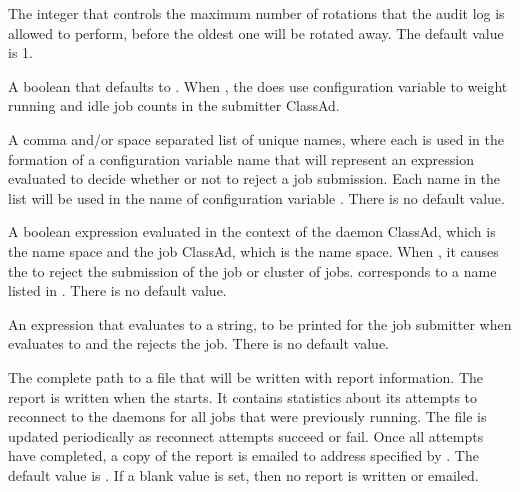 \begin{description}
\label{param:MaxNumScheddAuditLog}
\item[\Macro{MAX\_NUM\_SCHEDD\_AUDIT\_LOG}]
  The integer that controls the maximum number of rotations that
  the  audit log is allowed to perform,
  before the oldest one will be rotated away. The default value is 1. 

\label{param:ScheddUseSlotWeight}
\item[\Macro{SCHEDD\_USE\_SLOT\_WEIGHT}]
  A boolean that defaults to . When , 
  the  does use configuration variable  
  to weight running and idle job counts in the submitter ClassAd.

\label{param:SubmitRequirementNames}
\item[\Macro{SUBMIT\_REQUIREMENT\_NAMES}]
  A comma and/or space separated list of unique names, 
  where each is used in the formation
  of a configuration variable name that will represent an expression
  evaluated to decide whether or not to reject a job submission.
  Each name in the list will be used in the name of
  configuration variable .
  There is no default value.

\label{param:SubmitRequirementName}
\item[\Macro{SUBMIT\_REQUIREMENT\_<Name>}]
  A boolean expression 
  evaluated in the context of the  daemon ClassAd,
  which is the  name space and the job ClassAd, 
  which is the  name space.
  When , it causes the  to reject 
  the submission of the job or cluster of jobs. 
   corresponds to a name listed in 
  .
  There is no default value.

\label{param:SubmitRequirementNameReason}
\item[\Macro{SUBMIT\_REQUIREMENT\_<Name>\_REASON}]
  An expression that evaluates to a string,
  to be printed for the job submitter when 
  evaluates to  and the  rejects the job.
  There is no default value.

\label{param:ScheddRestartReport}
\item[\Macro{SCHEDD\_RESTART\_REPORT}]
  The complete path to a file that will be written with report information.
  The report is written when the  starts.
  It contains statistics
  about its attempts to reconnect to the  daemons for all jobs
  that were previously running.
  The file is updated periodically as reconnect attempts succeed or fail.
  Once all attempts have completed, a copy of the report is emailed to
  address specified by .
  The default value is .
  If a blank value is set, then no report is written or emailed.


\end{description}
